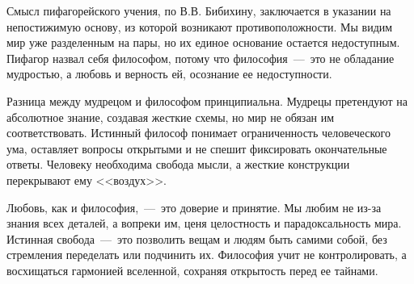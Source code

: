 Смысл пифагорейского учения, по В.В. Бибихину, заключается в указании на непостижимую основу, из которой возникают противоположности. Мы видим мир уже разделенным на пары, но их единое основание остается недоступным. Пифагор назвал себя философом, потому что философия~---~это не обладание мудростью, а любовь и верность ей, осознание ее недоступности.

Разница между мудрецом и философом принципиальна. Мудрецы претендуют на абсолютное знание, создавая жесткие схемы, но мир не обязан им соответствовать. Истинный философ понимает ограниченность человеческого ума, оставляет вопросы открытыми и не спешит фиксировать окончательные ответы. Человеку необходима свобода мысли, а жесткие конструкции перекрывают ему <<воздух>>.

Любовь, как и философия,~---~это доверие и принятие. Мы любим не из-за знания всех деталей, а вопреки им, ценя целостность и парадоксальность мира. Истинная свобода~---~это позволить вещам и людям быть самими собой, без стремления переделать или подчинить их. Философия учит не контролировать, а восхищаться гармонией вселенной, сохраняя открытость перед ее тайнами.



